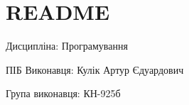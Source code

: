 \chapter{README}
\hypertarget{md_README}{}\label{md_README}
Дисципліна\+: Програмування

ПІБ Виконавця\+: Кулік Артур Єдуардович

Група виконавця\+: КН-\/925б 
